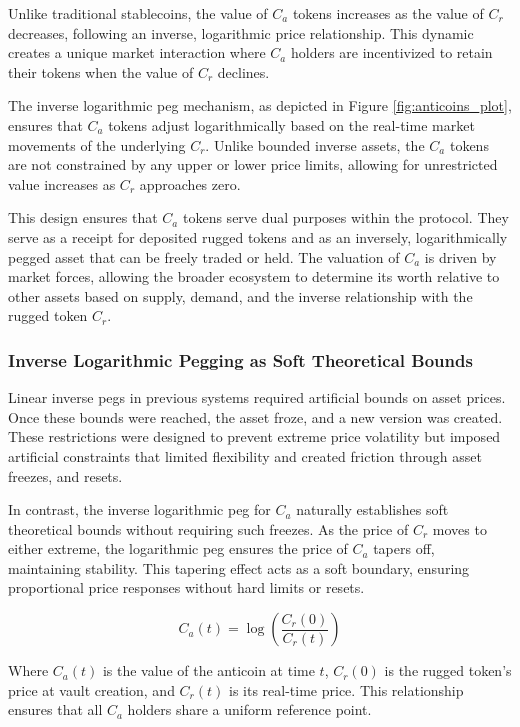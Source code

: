 \documentclass{article}
\begin{document}
Unlike traditional stablecoins, the value of $C_a$ tokens increases as the value of $C_r$ decreases, following an inverse, logarithmic price relationship. This dynamic creates a unique market interaction where $C_a$ holders are incentivized to retain their tokens when the value of $C_r$ declines.

The inverse logarithmic peg mechanism, as depicted in Figure \ref{fig:anticoins_plot}, ensures that $C_a$ tokens adjust logarithmically based on the real-time market movements of the underlying $C_r$. Unlike bounded inverse assets, the $C_a$ tokens are not constrained by any upper or lower price limits, allowing for unrestricted value increases as $C_r$ approaches zero.

This design ensures that $C_a$ tokens serve dual purposes within the protocol. They serve as a receipt for deposited rugged tokens and as an inversely, logarithmically pegged asset that can be freely traded or held. The valuation of $C_a$ is driven by market forces, allowing the broader ecosystem to determine its worth relative to other assets based on supply, demand, and the inverse relationship with the rugged token $C_r$.


\subsubsection{Inverse Logarithmic Pegging as Soft Theoretical Bounds}

Linear inverse pegs in previous systems required artificial bounds on asset prices. Once these bounds were reached, the asset froze, and a new version was created. These restrictions were designed to prevent extreme price volatility but imposed artificial constraints that limited flexibility and created friction through asset freezes, and resets.

In contrast, the inverse logarithmic peg for $C_a$ naturally establishes soft theoretical bounds without requiring such freezes. As the price of $C_r$ moves to either extreme, the logarithmic peg ensures the price of $C_a$ tapers off, maintaining stability. This tapering effect acts as a soft boundary, ensuring proportional price responses without hard limits or resets.

\[
C_{a}(t) = \log\left(\frac{C_{r}(0)}{C_{r}(t)}\right)
\]

Where \( C_{a}(t) \) is the value of the anticoin at time \( t \), \( C_{r}(0) \) is the rugged token's price at vault creation, and \( C_{r}(t) \) is its real-time price. This relationship ensures that all $C_a$ holders share a uniform reference point.
\end{document}
